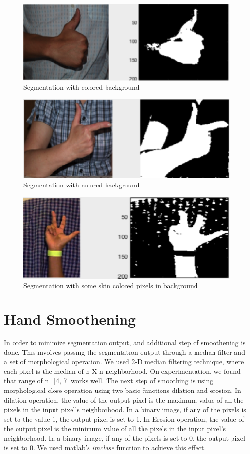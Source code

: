\documentclass{acm} %
\begin{document}
\begin{figure}[h]
\centering
\includegraphics[width=3 in]{basic_colored_background1}
\caption{Segmentation with colored background}
\label{fig:fig2}
\end{figure}

\begin{figure}[h]
\centering
\includegraphics[width=3 in]{basic_colored_background2}
\caption{Segmentation with colored background}
\label{fig:fig3}
\end{figure}

\begin{figure}[h]
\centering
\includegraphics[width=3 in]{skin_colored_background}
\caption{Segmentation with some skin colored pixels in background}
\label{fig:fig4}
\end{figure}

\section{Hand Smoothening}
In order to minimize segmentation output, and additional step of smoothening is done. This involves passing the segmentation output through a median filter and a set of morphological operation. We used 2-D  median filtering technique, where each pixel is  the median of  n X n  neighborhood. On experimentation, we found that range of n=[4, 7] works well.  The next step of smoothing is using morphological close operation using two basic functions dilation and erosion. In dilation operation, the value of the output pixel is the maximum value of all the pixels in the input pixel's neighborhood. In a binary image, if any of the pixels is set to the value 1, the output pixel is set to 1. In Erosion operation, the value of the output pixel is the minimum value of all the pixels in the input pixel's neighborhood. In a binary image, if any of the pixels is set to 0, the output pixel is set to 0. We used matlab's \textit{imclose} function to achieve this effect.
\end{document}
